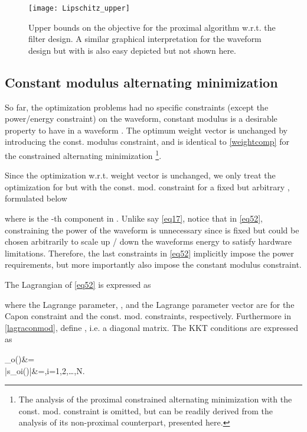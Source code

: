 \documentclass[11pt,draftclsnofoot,onecolumn]{IEEEtran}
\theoremstyle{definition}
\theoremstyle{remark}
\begin{document}
\begin{figure} [tbp!]
\centering
\texttt{[image: Lipschitz\_upper]}
\caption{Upper bounds on the objective for the proximal algorithm w.r.t. the filter design. A similar graphical interpretation for the waveform design but with  is also easy depicted but not shown here.}
\label{fig3}
\end{figure}
\subsection{Constant modulus alternating minimization}
So far, the optimization problems had no specific constraints (except the power/energy constraint) on the waveform, constant modulus is a desirable property to have in a waveform \cite{Setlurradar2014}. The optimum weight vector is unchanged by introducing the const. modulus constraint, and is identical to \eqref{weightcomp} for the constrained alternating minimization \footnote{The analysis of the proximal constrained alternating minimization with the const. mod. constraint is omitted, but can be readily derived from the analysis of its non-proximal counterpart, presented here.}.

Since the optimization w.r.t. weight vector is unchanged, we only treat the optimization for  but with the const. mod. constraint for a fixed but arbitrary , formulated below

 where  is the -th component in . Unlike say \eqref{eq17}, notice that in \eqref{eq52}, constraining  the power of the waveform is unnecessary since  is fixed but could be chosen arbitrarily to scale up / down the waveforms energy to satisfy hardware limitations. Therefore, the last  constraints in \eqref{eq52} implicitly impose the power requirements, but more importantly also impose the constant modulus constraint.

The Lagrangian of \eqref{eq52} is expressed as

where the Lagrange parameter, , and the Lagrange parameter vector  are for the Capon constraint and the  const. mod. constraints, respectively. Furthermore in  \eqref{lagraconmod}, define , i.e. a diagonal matrix. The KKT conditions are expressed as
 
_o()&= \\
|s_{oi}()|&=\rho,i=1,2,\ldots,N.
\end{document}
